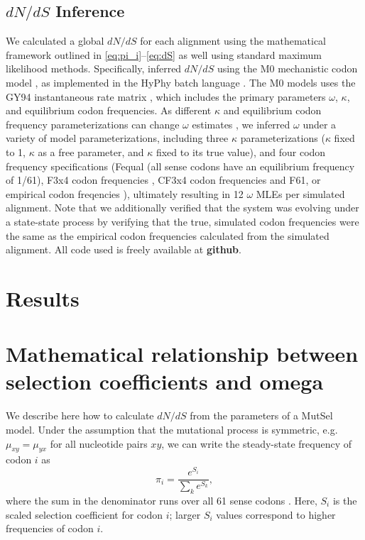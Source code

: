 \documentclass[11pt]{article}
\begin{document}
\subsection*{$dN/dS$ Inference}
We calculated a global $dN/dS$ for each alignment using the mathematical framework outlined in \eqref{eq:pi_i}--\eqref{eq:dS} as well using standard maximum likelihood methods. Specifically, inferred $dN/dS$ using the M0 mechanistic codon model \cite{Yangetal2000}, as implemented in the HyPhy batch language \cite{KosakovskyPondetal2005}. The M0 models uses the GY94 instantaneous rate matrix \cite{GoldmanYang1994,NielsenYang1998}, which includes the primary parameters $\omega$, $\kappa$, and equilibrium codon frequencies. As different $\kappa$ and equilibrium codon frequency parameterizations can change $\omega$ estimates \cite{YN00, Yang2006, ZhangYu2006}, we inferred $\omega$ under a variety of model parameterizations, including three $\kappa$ parameterizations ($\kappa$ fixed to 1, $\kappa$ as a free parameter, and $\kappa$ fixed to its true value), and four codon frequency specifications (Fequal (all sense codons have an equilibrium frequency of 1/61),  F3x4 codon frequencies \cite{MuseGaut1994}, CF3x4 codon frequencies \cite{Pond2010} and F61, or empirical codon freqencies \cite{GoldmanYang1994}), ultimately resulting in 12 $\omega$ MLEs per simulated alignment. Note that we additionally verified that the system was evolving under a state-state process by verifying that the true, simulated codon frequencies were the same as the empirical codon frequencies calculated from the simulated alignment. All code used is freely available at \textbf{github}. 



\section*{Results}


\section*{Mathematical relationship between selection coefficients and omega}


We describe here how to calculate $dN/dS$ from the parameters of a MutSel model. Under the assumption that the mutational process is symmetric, e.g. $\mu_{xy}=\mu_{yx}$ for all nucleotide pairs $xy$, we can write the steady-state frequency of codon $i$ as 
\begin{equation}\label{eq:pi_i}
 \pi_i=\frac{e^{S_i}}{\sum_k e^{S_k}},
\end{equation}
where the sum in the denominator runs over all 61 sense codons \cite{SellaHirsh2005}. Here, $S_i$ is the scaled selection coefficient for codon $i$; larger $S_i$ values correspond to higher frequencies of codon $i$.
\end{document}

